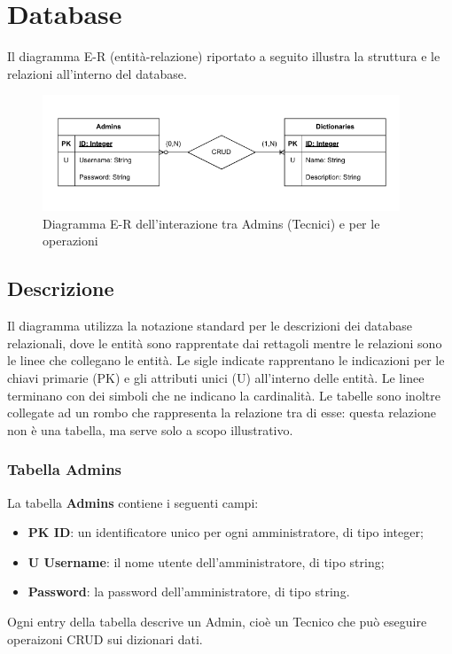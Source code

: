 \section{Database}

Il diagramma E-R (entità-relazione) riportato a seguito illustra la struttura e le relazioni all'interno del database.

\begin{figure}[H]
    \centering
    \includegraphics[width=0.95\textwidth]{assets/Database/DiagrammiDB.png}
    \caption{Diagramma E-R dell'interazione tra Admins (Tecnici) e  per le operazioni }
\end{figure}

\subsection{Descrizione}
Il diagramma utilizza la notazione standard per le descrizioni dei database relazionali, dove le entità sono rapprentate dai rettagoli mentre le relazioni sono le linee che collegano le entità. Le sigle indicate rapprentano le indicazioni per le chiavi primarie (PK) e gli attributi unici (U) all'interno delle entità. Le linee terminano con dei simboli che ne indicano la cardinalità. Le tabelle sono inoltre collegate ad un rombo che rappresenta la relazione tra di esse: questa relazione non è una tabella, ma serve solo a scopo illustrativo.

\subsubsection{Tabella Admins}
La tabella \textbf{Admins} contiene i seguenti campi:
\begin{itemize}
    \item \textbf{PK ID}: un identificatore unico per ogni amministratore, di tipo integer;
    \item \textbf{U Username}: il nome utente dell'amministratore, di tipo string;
    \item \textbf{Password}: la password dell'amministratore, di tipo string.
\end{itemize}
Ogni entry della tabella descrive un Admin, cioè un Tecnico che può eseguire operaizoni CRUD sui dizionari dati.

